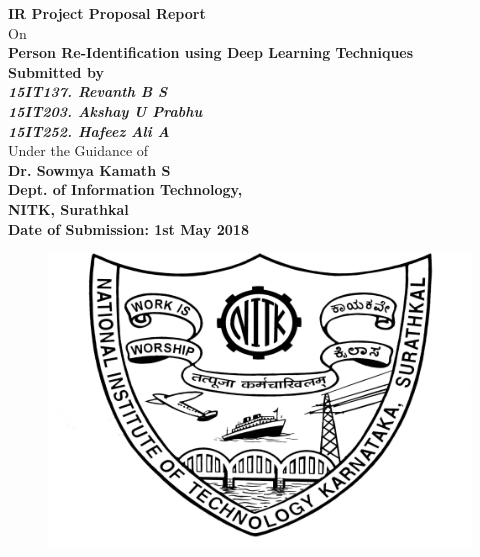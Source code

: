 \documentclass{article}[12pt,a4paper]
\begin{document}
\begin{titlepage}
    \begin{singlespacing}

    \centering
    \vspace{-3em}
    {\Large\textbf{IR Project Proposal Report}}\\
    \vspace{1em}
    On\\
    \vspace{1em}
    {\Huge \textbf{Person Re-Identification using Deep Learning Techniques}}\\
    \vspace{2em}
    {\LARGE \bfseries Submitted by}\\
    \vspace{2em}
    {\Large \emph{\textbf{15IT137.  Revanth B S}}}\\
    \vspace{0.5em}
    {\Large \emph{\textbf{15IT203.  Akshay U Prabhu}}}\\
    \vspace{0.5em}
    {\Large \emph{\textbf{15IT252.  Hafeez Ali A}}}\\
    \vspace{2em}
    {\Large Under the Guidance of}\\
    \vspace{2em}
    {\Large \textbf{Dr. Sowmya Kamath S}}\\
    \vspace{2em}
    {\Large \textbf{Dept. of Information Technology,}}\\
    \vspace{1em}
    {\Large \textbf{NITK, Surathkal}}\\
    \vspace{2.5em}
    {\Large \textbf{Date of Submission: 1st May 2018}}\\
    \vspace{1em}
    \begin{figure}[!ht]
        \centering
        \includegraphics{nitk-logo.png}

\end{figure}
\end{singlespacing}
\end{titlepage}
\end{document}
